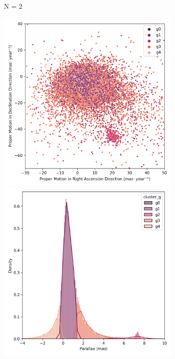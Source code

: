 \documentclass[11pt,a4paper,english,twocolumn]{article}
\begin{document}
\begin{figure}[!htbp]
\begin{subfigure}[b]{0.3\textwidth}
      \caption{N = 2}
  \end{subfigure}
  \medskip
  \begin{subfigure}[b]{0.3\textwidth}
    \centering
      \includegraphics[width=\textwidth]{../figures/kmeans/kmeans_n5_pm_melotte_22.png}
      \includegraphics[width=\textwidth]{../figures/kmeans/kmeans_n5_parallax_melotte_22.png}

\end{subfigure}
\end{figure}
\end{document}
